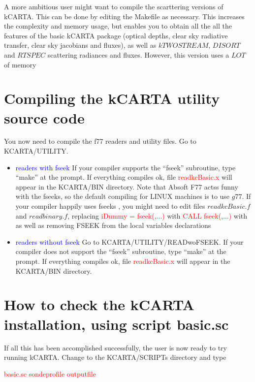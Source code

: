 \documentclass[11pt]{article}
\newcommand{\kc}{\textsf{kCARTA}\xspace}
\begin{document}
A more ambitious user might want to compile the scarttering versions of \kc.
This can be done by editing the Makefile as necessary. This increases the 
complexity and memory usage, but enables you to obtain all the all the 
features of the basic kCARTA package (optical depths, clear  sky radiative 
transfer, clear sky jacobians and fluxes), as well as $kTWOSTREAM$, $DISORT$ 
and $RTSPEC$ scattering radiances and fluxes. However, this version uses a 
$LOT$ of memory

\section{Compiling the \kc utility source code}
You now need to compile the f77 readers and utility files. Go to 
KCARTA/UTILITY.

\begin{itemize}
\item \textcolor{blue} {readers with fseek}  If your compiler supports the  
``fseek'' subroutine, type ``make'' at the prompt. If everything compiles ok, 
file \textcolor{red}{readkcBasic.x} will appear in the KCARTA/BIN directory.
Note that Absoft F77 actss funny with the fseeks, so the default compiling 
for LINUX machines is to use $g77$. If your compiler happily uses fseeks , you
might need to edit files $readkcBasic.f$ and $readbinary.f$, replacing 
\textcolor{red}{iDummy = fseek(,...)} with
\textcolor{red}{CALL fseek(,...)} with
as well as removing FSEEK from the local variables declarations
\item \textcolor{blue} {readers without fseek} Go to 
KCARTA/UTILITY/READwoFSEEK. If your compiler does not support the 
``fseek'' subroutine, type ``make'' at the prompt. If everything compiles ok, 
file \textcolor{red}{readkcBasic.x} will appear in the KCARTA/BIN directory.
\end{itemize}

\section{How to check the \kc installation, using script basic.sc}

If all this has been accomplished successfully, the user is now ready to try 
running \kc. Change to the KCARTA/SCRIPTs directory and type \\
\begin{center}
\textcolor{red} {basic.sc sondeprofile outputfile}
\end{center}
\end{document}
